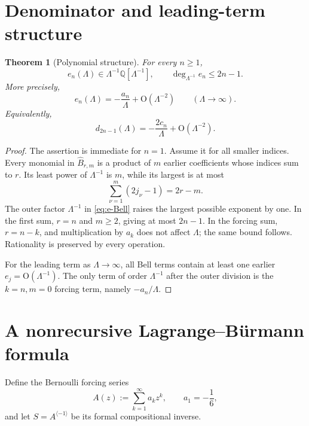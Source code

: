 \documentclass[11pt,a4paper,oneside]{book}
\newtheorem{theorem}{Theorem}[chapter]
\newcommand{\Q}{\mathbb Q}
\newcommand{\Ord}{\mathrm O}
\begin{document}
\section{Denominator and leading-term structure}

\begin{theorem}[Polynomial structure]\label{thm:polynomial-structure}
For every \(n\ge1\),
\begin{equation}\label{eq:en-ring}
 e_n(\Lambda)\in
 \Lambda^{-1}\Q[\Lambda^{-1}],
 \qquad
 \deg_{\Lambda^{-1}}e_n\le2n-1.
\end{equation}
More precisely,
\begin{equation}\label{eq:en-leading}
 e_n(\Lambda)
 =-\frac{a_n}{\Lambda}
  +\Ord(\Lambda^{-2})
 \qquad(\Lambda\to\infty).
\end{equation}
Equivalently,
\[
 d_{2n-1}(\Lambda)
 =-\frac{2c_n}{\Lambda}+\Ord(\Lambda^{-2}).
\]
\end{theorem}

\begin{proof}
The assertion is immediate for \(n=1\).  Assume it for all smaller indices.
Every monomial in \(\widehat B_{r,m}\) is a product of \(m\) earlier
coefficients whose indices sum to \(r\).  Its least power of
\(\Lambda^{-1}\) is \(m\), while its largest is at most
\[
 \sum_{\nu=1}^m(2j_\nu-1)=2r-m.
\]
The outer factor \(\Lambda^{-1}\) in \cref{eq:e-Bell} raises the largest
possible exponent by one.  In the first sum, \(r=n\) and \(m\ge2\), giving at
most \(2n-1\).  In the forcing sum, \(r=n-k\), and multiplication by \(a_k\)
does not affect \(\Lambda\); the same bound follows.  Rationality is preserved
by every operation.

For the leading term as \(\Lambda\to\infty\), all Bell terms contain at least
one earlier \(e_j=\Ord(\Lambda^{-1})\).  The only term of order
\(\Lambda^{-1}\) after the outer division is the \(k=n,m=0\) forcing term,
namely \(-a_n/\Lambda\).
\end{proof}

\section{A nonrecursive Lagrange--B\"urmann formula}

Define the Bernoulli forcing series
\begin{equation}\label{eq:A-series}
 A(z):=\sum_{k=1}^\infty a_kz^k,
 \qquad a_1=-\frac16,
\end{equation}
and let \(S=A^{\langle-1\rangle}\) be its formal compositional inverse.
\end{document}
